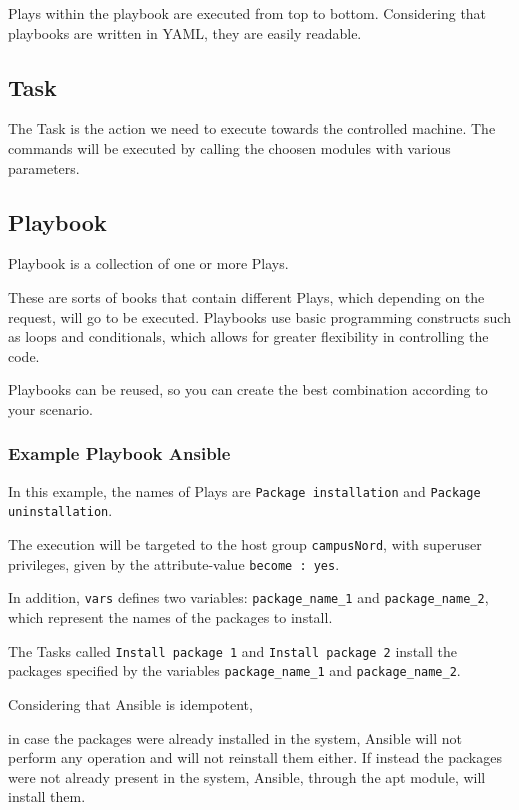\documentclass[12pt,a4paper,openright,twoside]{book}
\begin{document}
Plays within the playbook are executed from top to bottom. Considering that playbooks are written in YAML, they are easily readable.

\subsection{Task}
The Task is the action we need to execute towards the controlled machine. The commands will be executed by calling the choosen modules with various parameters.

\subsection{Playbook}
Playbook is a collection of one or more Plays.


These are sorts of books that contain different Plays, which depending on the request, will go to be executed. Playbooks use basic programming constructs such as loops and conditionals, which allows for greater flexibility in controlling the code.


Playbooks can be reused, so you can create the best combination according to your scenario.

\subsubsection{Example Playbook Ansible}



In this example, the names of Plays are \texttt{Package installation} and \texttt{Package uninstallation}.


The execution will be targeted to the host group \texttt{campusNord}, with superuser privileges, given by the attribute-value \texttt{become : yes}.


In addition, \texttt{vars} defines two variables: \texttt{package\_name\_1} and \texttt{package\_name\_2}, which represent the names of the packages to install.


The Tasks called \texttt{Install package 1} and \texttt{Install package 2} install the packages specified by the variables \texttt{package\_name\_1} and \texttt{package\_name\_2}.


Considering that Ansible is idempotent,


in case the packages were already installed in the system, Ansible will not perform any operation and will not reinstall them either. If instead the packages were not already present in the system, Ansible, through the apt module, will install them.
\end{document}

